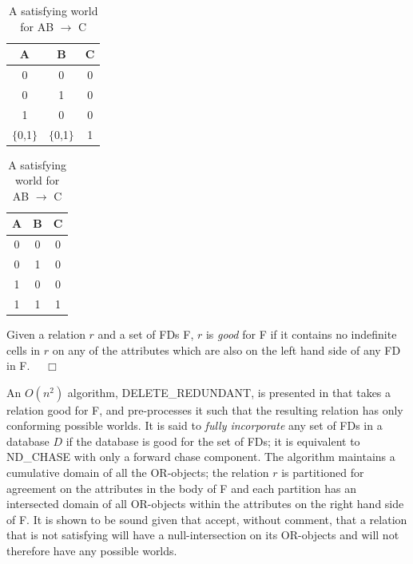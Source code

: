 {\line
\begin{table}[ht]
\begin{minipage}[b]{7cm}
\begin{center}
\begin{tabular}{|c|c|c|} \hline
 {\bf A} & {\bf B} & {\bf C} \\\hline
 0 & 0 & 0 \\ 
 0 & 1 & 0 \\ 
 1 & 0 & 0 \\ 
 $\{$0,1$\}$ & $\{$0,1$\}$ & 1 \\ \hline
\end{tabular}
\end{center}
\caption{\label{tbl:backchase1}Indefinite relation $r$, FD AB $\to$ C} 
\end{minipage}
\hfill
\begin{minipage}[b]{7cm}
\begin{center}
\begin{tabular}{|c|c|c|} \hline
 {\bf A} & {\bf B} & {\bf C} \\\hline
 0 & 0 & 0 \\ 
 0 & 1 & 0 \\ 
 1 & 0 & 0 \\ 
 1 & 1 & 1 \\ \hline
\end{tabular}
\end{center}
\caption{\label{tbl:backchase2}A satisfying world for AB $\to$ C} 
\end{minipage}
\end{table}
}

\begin{definition}\label{cp:def_good}
\begin{rm}
Given a relation $r$ and a set of FDs F,
$r$ is { \em good} for F if it contains no indefinite cells in $r$ on any
of the attributes which are also on the left hand side of any FD in
F. $\quad\Box$ 
\end{rm}
\end{definition}
\smallskip
An $O(n^2)$ algorithm, DELETE\_REDUNDANT, is presented in \cite{vn95} that takes a relation good for F, and
pre-processes it such that the resulting relation has only conforming
possible worlds.  It is said to {\em fully incorporate} any set of FDs in
a database $D$ if the database is good for the set of FDs; it is
equivalent to ND\_CHASE with 
only a forward chase component. The algorithm maintains a cumulative
domain of all the OR-objects; the relation $r$ is partitioned for
agreement on the attributes in the body of F and each partition
has an intersected domain of all OR-objects within the attributes
on the right hand side of F. It is shown to be
sound given that \cite{vn95} accept, without comment, that a
relation that is not satisfying will have a null-intersection on its
OR-objects and will not therefore have any possible worlds.\\


